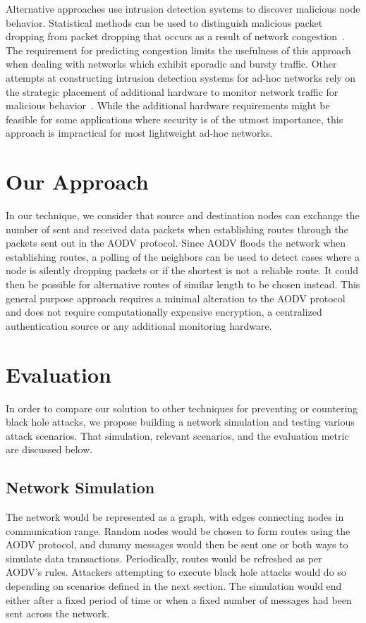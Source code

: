 \documentclass[12pt,a4paper]{report}
\begin{document}
Alternative approaches use intrusion detection systems to discover malicious node behavior. Statistical methods can be used to distinguish malicious packet dropping from packet dropping that occurs as a result of network congestion~\cite{1258776}. The requirement for predicting congestion limits the usefulness of this approach when dealing with networks which exhibit sporadic and bursty traffic. Other attempts at constructing intrusion detection systems for ad-hoc networks rely on the strategic placement of additional hardware to monitor network traffic for malicious behavior~\cite{Tseng:2003:SID:986858.986876}. While the additional hardware requirements might be feasible for some applications where security is of the utmost importance, this approach is impractical for most lightweight ad-hoc networks.

\section{Our Approach}
In our technique, we consider that source and destination nodes can exchange the number of sent and received data packets when establishing routes through the packets sent out in the AODV protocol. Since AODV floods the network when establishing routes, a polling of the neighbors can be used to detect cases where a node is silently dropping packets or if the shortest is not a reliable route.  It could then be possible for alternative routes of similar length to be chosen instead. This general purpose approach requires a minimal alteration to the AODV protocol and does not require computationally expensive encryption, a centralized authentication source or any additional monitoring hardware.

\section{Evaluation}
In order to compare our solution to other techniques for preventing or countering black hole attacks, we propose building a network simulation and testing various attack scenarios. That simulation, relevant scenarios, and the evaluation metric are discussed below.

\subsection{Network Simulation}
The network would be represented as a graph, with edges connecting nodes in communication range. Random nodes would be chosen to form routes using the AODV protocol, and dummy messages would then be sent one or both ways to simulate data transactions. Periodically, routes would be refreshed as per AODV's rules. Attackers attempting to execute black hole attacks would do so depending on scenarios defined in the next section. The simulation would end either after a fixed period of time or when a fixed number of messages had been sent across the network.
\end{document}
